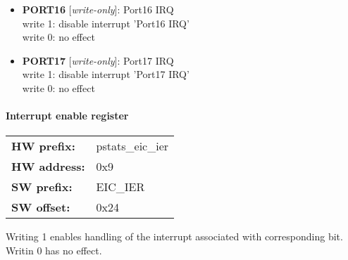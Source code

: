 \begin{itemize}
\begin{small}
{\bf 
PORT15
} [\emph{write-only}]: Port15 IRQ
\\
write 1: disable interrupt 'Port15 IRQ'\\write 0: no effect
\end{small}
\item \begin{small}
{\bf 
PORT16
} [\emph{write-only}]: Port16 IRQ
\\
write 1: disable interrupt 'Port16 IRQ'\\write 0: no effect
\end{small}
\item \begin{small}
{\bf 
PORT17
} [\emph{write-only}]: Port17 IRQ
\\
write 1: disable interrupt 'Port17 IRQ'\\write 0: no effect
\end{small}
\end{itemize}
\paragraph*{Interrupt enable register}\vspace{12pt}

\begin{tabular}{l l }
{\bf HW prefix:}  & pstats\_eic\_ier\\
{\bf HW address:}  & 0x9\\
{\bf SW prefix:}  & EIC\_IER\\
{\bf SW offset:}  & 0x24\\
\end{tabular}

\vspace{12pt}
Writing 1 enables handling of the interrupt associated with corresponding bit. Writin 0 has no effect.

